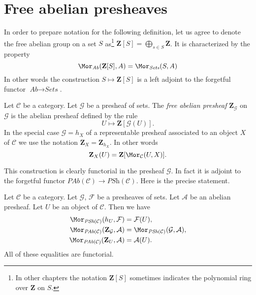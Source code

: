 \section{Free abelian presheaves}
\label{section-free-abelian-presheaf}

\noindent
In order to prepare notation for the following definition, let us agree
to denote the free abelian group on a set $S$ as\footnote{In other chapters
the notation $\mathbf{Z}[S]$ sometimes indicates the polynomial ring over
$\mathbf{Z}$ on $S$.}
$\mathbf{Z}[S] = \bigoplus_{s \in S} \mathbf{Z}$. It is characterized
by the property
$$
\Mor_{\textit{Ab}}(\mathbf{Z}[S], A)
=
\Mor_{\textit{Sets}}(S, A)
$$
In other words the construction $S \mapsto \mathbf{Z}[S]$ is a left adjoint
to the forgetful functor $\textit{Ab} \to \textit{Sets}$.

\begin{definition}
\label{definition-free-abelian-presheaf-on}
Let $\mathcal{C}$ be a category. Let $\mathcal{G}$ be a presheaf of sets.
The {\it free abelian presheaf} $\mathbf{Z}_\mathcal{G}$ on $\mathcal{G}$
is the abelian presheaf defined by the rule
$$
U \longmapsto \mathbf{Z}[\mathcal{G}(U)].
$$
In the special case $\mathcal{G} = h_X$ of a representable presheaf
associated to an object $X$ of $\mathcal{C}$
we use the notation $\mathbf{Z}_X = \mathbf{Z}_{h_X}$. In other words
$$
\mathbf{Z}_X(U) = \mathbf{Z}[\Mor_\mathcal{C}(U, X)].
$$
\end{definition}

\noindent
This construction is clearly functorial in the presheaf $\mathcal{G}$.
In fact it is adjoint to the forgetful functor
$\textit{PAb}(\mathcal{C}) \to \textit{PSh}(\mathcal{C})$.
Here is the precise statement.

\begin{lemma}
\label{lemma-obvious-adjointness}
Let $\mathcal{C}$ be a category.
Let $\mathcal{G}$, $\mathcal{F}$ be a presheaves of sets.
Let $\mathcal{A}$ be an abelian presheaf.
Let $U$ be an object of $\mathcal{C}$. Then
we have
\begin{align*}
\Mor_{\textit{PSh}(\mathcal{C})}(h_U, \mathcal{F})
& =
\mathcal{F}(U), \\
\Mor_{\textit{PAb}(\mathcal{C})}(\mathbf{Z}_\mathcal{G}, \mathcal{A})
& =
\Mor_{\textit{PSh}(\mathcal{C})}(\mathcal{G}, \mathcal{A}), \\
\Mor_{\textit{PAb}(\mathcal{C})}(\mathbf{Z}_U, \mathcal{A})
& =
\mathcal{A}(U).
\end{align*}
All of these equalities are functorial.
\end{lemma}

